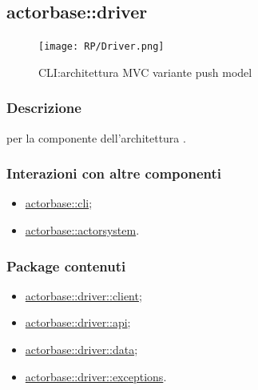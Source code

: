 \documentclass{scalatekids-article}
\begin{document}

\subsection{actorbase::driver}
\label{sec:actorbase::driver}

\begin{figure}[H]
  \begin{center}
    \texttt{[image: RP/Driver.png]}
    \caption{CLI:architettura MVC variante push model}
  \end{center}
\end{figure}

\subsubsection{Descrizione}

 per la componente  dell'architettura
.

\subsubsection{Interazioni con altre componenti}

\begin{itemize}
\item \hyperref[sec:actorbase::cli]{actorbase::cli};
\item \hyperref[sec:actorbase::actorsystem]{actorbase::actorsystem}.
\end{itemize}

\subsubsection{Package contenuti}

\begin{itemize}
\item \hyperref[sec:actorbase::driver::client]{actorbase::driver::client};
\item \hyperref[sec:actorbase::driver::serializer]{actorbase::driver::api};
\item \hyperref[sec:actorbase::driver::actorbasedata]{actorbase::driver::data};
\item \hyperref[sec:actorbase::driver::exceptions]{actorbase::driver::exceptions}.
\end{itemize}
\end{document}
